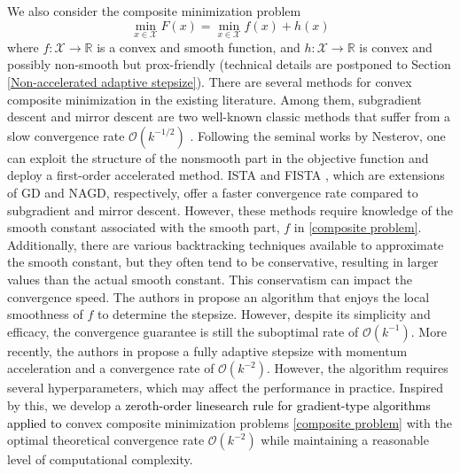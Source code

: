 \documentclass[11pt, a4paper, oneside, reqno]{amsart}
\begin{document}
We also consider the composite minimization problem
            \begin{equation}\label{composite problem}
                \min_{x \in \mathcal{X}} F(x) = \min_{x \in \mathcal{X}} f(x)+h(x)
            \end{equation}
where $f\colon \mathcal{X} \to \mathbb{R}$ is a convex and smooth function, and $h\colon \mathcal{X} \to \mathbb{R}$ is convex and possibly non-smooth but prox-friendly (technical details are postponed to Section \ref{Non-accelerated adaptive stepsize}). There are several methods for convex composite minimization in the existing literature. Among them, subgradient descent and mirror descent are two well-known classic methods that suffer from a slow convergence rate $\mathcal{O}(k^{-1/2})$ \cite{nemirovskij1983problem,Beck2003,yurtsever2018conditional,yang2018rsg}. Following the seminal works by Nesterov, one can exploit the structure of the nonsmooth part in the objective function and deploy a first-order accelerated method.  ISTA and FISTA \cite{Beck2009}, which are extensions of GD and NAGD, respectively, offer a faster convergence rate compared to subgradient and mirror descent. However, these methods require knowledge of the smooth constant associated with the smooth part, $f$ in \eqref{composite problem}. Additionally, there are various backtracking techniques available to approximate the smooth constant, but they often tend to be conservative, resulting in larger values than the actual smooth constant. This conservatism can impact the convergence speed. The authors in \cite{vladarean2021first, malitsky2020golden} propose an algorithm that enjoys the local smoothness of $f$ to determine the stepsize. However, despite its simplicity and efficacy, the convergence guarantee is still the suboptimal rate of $\mathcal{O}(k^{-1})$. More recently, the authors in \cite{li2023simple} propose a fully adaptive stepsize with momentum acceleration and a convergence rate of $\mathcal{O}(k^{-2})$. However, the algorithm requires several hyperparameters, which may affect the performance in practice. Inspired by this, we develop a \textcolor{black}{zeroth-order linesearch rule for gradient-type algorithms applied to} convex composite minimization problems \eqref{composite problem} with the optimal theoretical convergence rate $\mathcal{O}(k^{-2})$ while maintaining a reasonable level of computational complexity.
        
\end{document}
